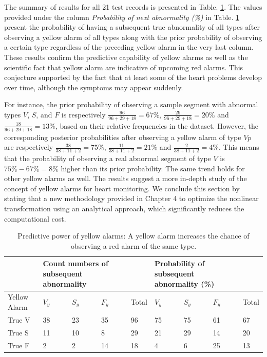 The summary of results for all 21 test records is presented in Table. \ref{table:pred_kernel}. The values provided under the column \textit{Probability of next abnormality (\%)} in Table. \ref{table:pred_kernel} present the probability of having a subsequent true abnormality of all types after observing a yellow alarm of all types along with the prior probability of observing a certain type regardless of the preceding yellow alarm in the very last column. %
These results confirm the predictive capability of yellow alarms as well as the scientific fact that yellow alarm are indicative of upcoming red alarms. This conjecture supported by the fact that at least some of the heart problems develop over time, although the symptoms may appear suddenly. 
 
For instance, the prior probability of observing a sample segment with abnormal types $V$, $S$, and $F$ is respectively $\frac{96}{96+29+18}=67\%$, $\frac{29}{96+29+18}=20\%$ and $\frac{18}{96+29+18}=13\%$, based on their relative frequencies in the dataset. However, the corresponding posterior probabilities after observing a yellow alarm of type $Vp$ are respectively $\frac{38}{38+11+2}=75\%$, $\frac{11}{38+11+2}=21\%$ and $\frac{2}{38+11+2}=4\%$. This means that the probability of observing a real abnormal segment of type $V$ is $75\%-67\%=8\%$ higher than its prior probability. The same trend holds for other yellow alarms as well. The results suggest a more in-depth study of the concept of yellow alarms for heart monitoring. 
We conclude this section by stating that a new methodology provided in Chapter 4 to optimize the nonlinear transformation using an analytical approach, which significantly reduces the computational cost.

\begin{table}
	\caption{Predictive power of yellow alarms: A yellow alarm increases the chance of observing a red alarm of the same type.}
	\centering
	\begin{tabular}{|m{6em}| m{2em}| m{2em}| m{2em} |m{2em}| m{2em}| m{2em}| m{2em}| m{2em}|}
		\hline
		& \multicolumn{3}{p{6em}}{Count numbers of subsequent abnormality}& &\multicolumn{3}{p{6em}}{Probability of subsequent abnormality (\%)}  & \\ 
		\hline 
		Yellow Alarm & $V_y$ & $S_y$ & $F_y$ & Total & $V_y$ & $S_y$ & $F_y$ & Total \\ 
		\hline 
		True V & 38 & 23 & 35& 96 & 75 & 75 & 61 & 67 \\ 
		\hline 
		True S & 11 & 10 & 8 & 29 & 21 & 29 & 14& 20 \\ 
		\hline 
		True F & 2 & 2 & 14 & 18 & 4 & 6 & 25 & 13 \\ 
		\hline 
	\end{tabular}%
	\label{table:pred_kernel}
\end{table}


